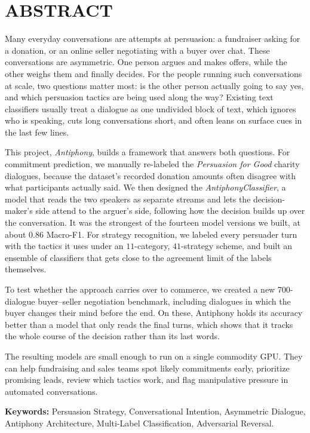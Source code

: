 \chapter*{ABSTRACT}

Many everyday conversations are attempts at persuasion: a fundraiser asking for a donation, or an online seller negotiating with a buyer over chat. These conversations are asymmetric. One person argues and makes offers, while the other weighs them and finally decides. For the people running such conversations at scale, two questions matter most: is the other person actually going to say yes, and which persuasion tactics are being used along the way? Existing text classifiers usually treat a dialogue as one undivided block of text, which ignores who is speaking, cuts long conversations short, and often leans on surface cues in the last few lines.

This project, \textit{Antiphony}, builds a framework that answers both questions. For commitment prediction, we manually re-labeled the \textit{Persuasion for Good} charity dialogues, because the dataset's recorded donation amounts often disagree with what participants actually said. We then designed the \textit{AntiphonyClassifier}, a model that reads the two speakers as separate streams and lets the decision-maker's side attend to the arguer's side, following how the decision builds up over the conversation. It was the strongest of the fourteen model versions we built, at about $0.86$ Macro-F1. For strategy recognition, we labeled every persuader turn with the tactics it uses under an $11$-category, $41$-strategy scheme, and built an ensemble of classifiers that gets close to the agreement limit of the labels themselves.

To test whether the approach carries over to commerce, we created a new 700-dialogue buyer--seller negotiation benchmark, including dialogues in which the buyer changes their mind before the end. On these, Antiphony holds its accuracy better than a model that only reads the final turns, which shows that it tracks the whole course of the decision rather than its last words.

The resulting models are small enough to run on a single commodity GPU. They can help fundraising and sales teams spot likely commitments early, prioritize promising leads, review which tactics work, and flag manipulative pressure in automated conversations.

\vspace{12pt}
\noindent\textbf{Keywords:} Persuasion Strategy, Conversational Intention, Asymmetric Dialogue, Antiphony Architecture, Multi-Label Classification, Adversarial Reversal.
\clearpage
